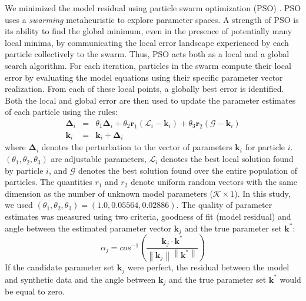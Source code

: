 \documentclass[processes,article,accept,moreauthors,pdftex,12pt,a4paper]{mdpi}
\newcommand{\norm}[1]{\left\lVert#1\right\rVert}
\begin{document}
We minimized the model residual using particle swarm optimization (PSO) \citep{PSO}.
PSO uses a \textit{swarming} metaheuristic to explore parameter spaces. 
A strength of PSO is its ability to find the global minimum, even in the presence of potentially many local minima, by communicating the local
error landscape experienced by each particle collectively to the swarm. Thus, PSO acts both as a local and a global search algorithm. 
For each iteration, particles in the swarm compute their local error by evaluating the model equations using their specific parameter vector realization.
From each of these local points, a globally best error is identified. Both the local and global error 
are then used to update the parameter estimates of each particle using the rules:
\begin{eqnarray}
	\mathbf{\Delta}_{i} &=&\theta_{1}\mathbf{\Delta}_{i} + \theta_{2}\mathbf{r}_{1}\left(\mathcal{L}_{i} - \mathbf{k}_{i}\right) + \theta_{3}\mathbf{r}_{2}\left(\mathcal{G} - \mathbf{k}_{i}\right) \\
	\mathbf{k}_{i} &=& \mathbf{k}_{i} + \mathbf{\Delta}_{i}
\end{eqnarray}
where $\mathbf{\Delta}_i$ denotes the perturbation to the vector of parameters $\mathbf{k}_i$ for particle $i$. 
$\left(\theta_{1},\theta_{2},\theta_{3}\right)$ are adjustable parameters, $\mathcal{L}_{i}$ denotes the best local solution found by particle $i$, and
$\mathcal{G}$ denotes the best solution found over the entire population of particles. The quantities $r_{1}$ and $r_{2}$ denote uniform random vectors with the same dimension as the number of unknown model
parameters ($\mathcal{K}\times{1}$). In this study, we used $\left(\theta_{1},\theta_{2},\theta_{3}\right) = \left(1.0, 0.05564, 0.02886\right)$. The quality of parameter
estimates was measured using two criteria, goodness of fit (model residual) and angle between the estimated parameter vector $\mathbf{k}_{j}$ and the true parameter set $\mathbf{k}^{*}$:
\begin{equation}
	\alpha_{j} = cos^{-1}\left(\frac{\mathbf{k}_{j}\cdot{\mathbf{k^{*}}}}{\norm{\mathbf{k}_{j}}\norm{\mathbf{k^{*}}}}\right)
\end{equation}If the candidate parameter set $\mathbf{k}_{j}$ were perfect, the residual between the model and synthetic data 
and the angle between $\mathbf{k}_{j}$ and the true parameter set $\mathbf{k}^{*}$ would be equal to zero.
\end{document}
